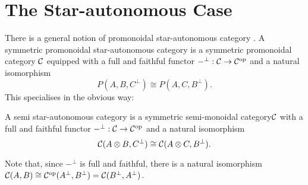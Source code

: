 \documentclass{robincs}
\newcommand\staraut{star-aut\-on\-om\-ous\xspace}
\newcommand\ssmc  {symmetric semi-mon\-oid\-al category\xspace}
\newcommand\sstac {semi star-aut\-on\-om\-ous category\xspace}
\renewcommand\perp{^\bot}
\begin{document}
\fi %

\section{The Star-autonomous Case}\label{s-sstac}
There is a general notion of promonoidal \staraut category
\citep[][\S7]{DSQuantum}. A symmetric promonoidal \staraut category
is a symmetric promonoidal category $\mathcal{C}$ equipped with a full and
faithful functor $-\perp: \C\to\C\op$ and a natural
isomorphism
\[
        P(A, B, C\perp) \cong P(A, C, B\perp).
\]
This specialises in the obvious way:
\begin{definition}
        A \sstac is a \ssmc $\mathcal{C}$ with a
        full and faithful functor $-\perp:\C\to\C\op$
        and a natural isomorphism
        \begin{equation}\label{eq-sstac}
                \C(A\tn B, C\perp) \cong \C(A\tn C, B\perp).
        \end{equation}
\end{definition}
Note that, since $-\perp$ is full and faithful, there is a natural
isomorphism $\C(A,B) \cong \C\op(A\perp,B\perp) = \C(B\perp, A\perp)$.
\end{document}
